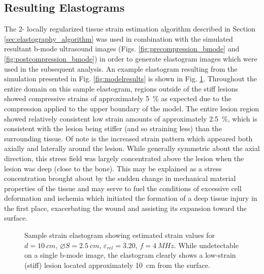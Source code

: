 		\subsection{Resulting Elastograms}
			\label{sec:elastogram}
			The 2- locally regularized tissue strain estimation algorithm described in Section \ref{sec:elastography_algorithm} was used in combination with the simulated resultant b-mode ultrasound images (Figs. \ref{fig:precompression_bmode} and \ref{fig:postcompression_bmode}) in order to generate elastogram images which were used in the subsequent analysis. An example elastogram resulting from the simulation presented in Fig. \ref{fig:modelresults} is shown in Fig. \ref{fig:sample_elastogram}. Throughout the entire domain on this sample elastogram, regions outside of the stiff lesions showed compressive strains of approximately \SI{5}{\percent} as expected due to the compression applied to the upper boundary of the model. The entire lesion region showed relatively consistent low strain amounts of approximately \SI{2.5}{\percent}, which is consistent with the lesion being stiffer (and so straining less) than the surrounding tissue. Of note is the increased strain pattern which appeared both axially and laterally around the lesion. While generally symmetric about the axial direction, this stress field was largely concentrated above the lesion when the lesion was deep (close to the bone). This may be explained as a stress concentration brought about by the sudden change in mechanical material properties of the tissue and may serve to fuel the conditions of excessive cell deformation and ischemia which initiated the formation of a deep tissue injury in the first place, exacerbating the wound and assisting its expansion toward the surface.

			\begin{figure}[!t]
				\centering
				\caption[Sample strain elastogram with a stiff lesion]{Sample strain elastogram showing estimated strain values for $d=\SI{10}{cm}$, $\diameter S = \SI{2.5}{cm}$, $\varepsilon_{rel} = 3.20$, $f = \SI{4}{MHz}$. While undetectable on a single b-mode image, the elastogram clearly shows a low-strain (stiff) lesion located approximately \SI{10}{cm} from the surface.}
				\label{fig:sample_elastogram}
			\end{figure}

